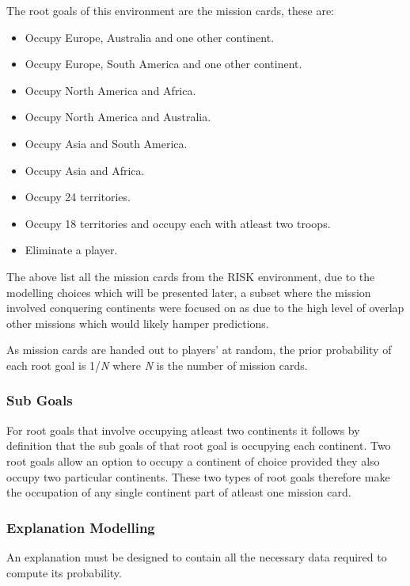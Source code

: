 \documentclass[parskip]{cs4rep}
\begin{document}
The root goals of this environment are the mission cards, these are:

\begin{itemize}
\item
Occupy Europe, Australia and one other continent.
\item
Occupy Europe, South America and one other continent.
\item
Occupy North America and Africa.
\item
Occupy North America and Australia.
\item
Occupy Asia and South America.
\item
Occupy Asia and Africa.
\item
Occupy 24 territories.
\item
Occupy 18 territories and occupy each with atleast two troops.
\item
Eliminate a player.
\newline
\end{itemize}

The above list all the mission cards from the RISK environment, due to the modelling choices which will be presented later, a subset where the mission involved conquering continents were focused on as due to the high level of overlap other missions which would likely hamper predictions.

As mission cards are handed out to players' at random, the prior probability of each root goal is 1/\textit{N} where \textit{N} is the number of mission cards.

\subsubsection{Sub Goals}

For root goals that involve occupying atleast two continents it follows by definition that the sub goals of that root goal is occupying each continent. Two root goals allow an option to occupy a continent of choice provided they also occupy two particular continents. These two types of root goals therefore make the occupation of any single continent part of atleast one mission card.

\subsubsection{Explanation Modelling}

An explanation must be designed to contain all the necessary data required to compute its probability.
\end{document}
